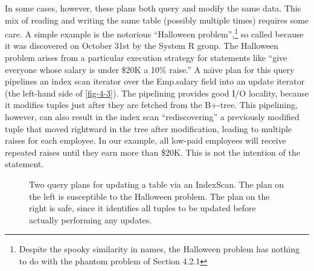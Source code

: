 \documentclass[a4paper,11pt,twoside,openright]{book}
\begin{document}
In some cases, however, these plans both query and modify the same data.
This mix of reading and writing the same table (possibly multiple times)
requires some care. A simple example is the notorious ``Halloween
problem'',\footnote{Despite the spooky similarity in names, the Halloween problem has
nothing to do with the phantom problem of Section 4.2.1} so called because it was discovered on
October 31st by the System R group. The Halloween problem arises from a
particular execution strategy for statements like ``give everyone whose
salary is under \$20K a 10\% raise.'' A na{\"\i}ve plan for this query
pipelines an index scan iterator over the Emp.salary field into an
update iterator (the left-hand side of \autoref{fig-4-3}). The pipelining
provides good I/O
locality, because it modifies tuples just after they are fetched from
the B+-tree. This pipelining, however, can also result in the index scan
``rediscovering'' a previously modified tuple that moved rightward in
the tree after modification, leading to multiple raises for each
employee. In our example, all low-paid employees will receive repeated
raises until they earn more than \$20K. This is not the intention of the
statement.

\begin{figure}
\centering
\centering
{}

\caption{Two query plans for updating a table via an IndexScan. The plan
on the left is susceptible to the Halloween problem. The plan on the
right is safe, since it identifies all tuples to be updated before
actually performing any updates.\label{fig-4-3}}
\end{figure}
\end{document}

